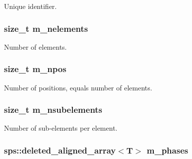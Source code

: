 Unique identifier. 

\hypertarget{singletonfnm_1_1ApertureData_abdbdad71db1171b8094096d729baba0d}{
\subsubsection[{m\+\_\+nelements}]{\setlength{\rightskip}{0pt plus 5cm}size\+\_\+t m\+\_\+nelements}}\label{singletonfnm_1_1ApertureData_abdbdad71db1171b8094096d729baba0d}


Number of elements. 

\hypertarget{singletonfnm_1_1ApertureData_ae07b6e86eb090f4c39fc425c78d91416}{
\subsubsection[{m\+\_\+npos}]{\setlength{\rightskip}{0pt plus 5cm}size\+\_\+t m\+\_\+npos}}\label{singletonfnm_1_1ApertureData_ae07b6e86eb090f4c39fc425c78d91416}


Number of positions, equals number of elements. 

\hypertarget{singletonfnm_1_1ApertureData_a3536d0df01270d92f8ccc3623a2d06a0}{
\subsubsection[{m\+\_\+nsubelements}]{\setlength{\rightskip}{0pt plus 5cm}size\+\_\+t m\+\_\+nsubelements}}\label{singletonfnm_1_1ApertureData_a3536d0df01270d92f8ccc3623a2d06a0}


Number of sub-\/elements per element. 

\hypertarget{singletonfnm_1_1ApertureData_a2939401ddbdafbc9797a8ac8f2a2bda1}{
\subsubsection[{m\+\_\+phases}]{\setlength{\rightskip}{0pt plus 5cm}sps\+::deleted\+\_\+aligned\+\_\+array$<$T$>$ m\+\_\+phases}}\label{singletonfnm_1_1ApertureData_a2939401ddbdafbc9797a8ac8f2a2bda1}


